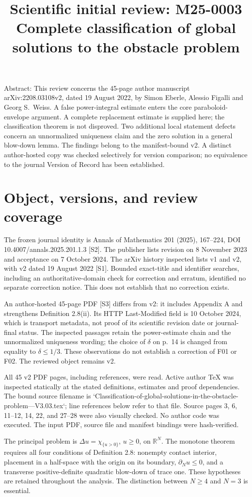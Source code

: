 \documentclass[10pt]{article}
\title{Scientific initial review: M25-0003
Complete classification of global solutions
to the obstacle problem}
\author{}
\date{}
\begin{document}
\maketitle
Abstract: This review concerns the 45-page author manuscript arXiv:2208.03108v2, dated 19 August 2022, by Simon Eberle, Alessio Figalli and Georg S. Weiss. A false power-integral estimate enters the core paraboloid-envelope argument. A complete replacement estimate is supplied here; the classification theorem is not disproved. Two additional local statement defects concern an unnormalized uniqueness claim and the zero solution in a general blow-down lemma. The findings belong to the manifest-bound v2. A distinct author-hosted copy was checked selectively for version comparison; no equivalence to the journal Version of Record has been established.\par
\section*{Object, versions, and review coverage}
The frozen journal identity is Annals of Mathematics 201 (2025), 167–224, DOI 10.4007/annals.2025.201.1.3 [S2]. The publisher lists revision on 8 November 2023 and acceptance on 7 October 2024. The arXiv history inspected lists v1 and v2, with v2 dated 19 August 2022 [S1]. Bounded exact-title and identifier searches, including an authoritative-domain check for correction and erratum, identified no separate correction notice. This does not establish that no correction exists.\par
An author-hosted 45-page PDF [S3] differs from v2: it includes Appendix A and strengthens Definition 2.8(ii). Its HTTP Last-Modified field is 10 October 2024, which is transport metadata, not proof of its scientific revision date or journal-final status. The inspected passages retain the power-estimate chain and the unnormalized uniqueness wording; the choice of \(\delta\) on p. 14 is changed from equality to \(\delta\leq1/3\). These observations do not establish a correction of F01 or F02. The reviewed object remains v2.\par
All 45 v2 PDF pages, including references, were read. Active author TeX was inspected statically at the stated definitions, estimates and proof dependencies. The bound source filename is `Classification-of-global-solutions-in-the-obstacle-problem—V3.03.tex`; line references below refer to that file. Source pages 3, 6, 11–12, 14, 22, and 27–28 were also visually checked. No author code was executed. The input PDF, source file and manifest bindings were hash-verified.\par
The principal problem is \(\Delta u=\chi_{\{u>0\}}\), \(u\geq0\), on \(\mathbb R^N\). The monotone theorem requires all four conditions of Definition 2.8: nonempty contact interior, placement in a half-space with the origin on its boundary, \(\partial_Nu\leq0\), and a transverse positive-definite quadratic blow-down of trace one. These hypotheses are retained throughout the analysis. The distinction between \(N\geq4\) and \(N=3\) is essential.\par
\end{document}
